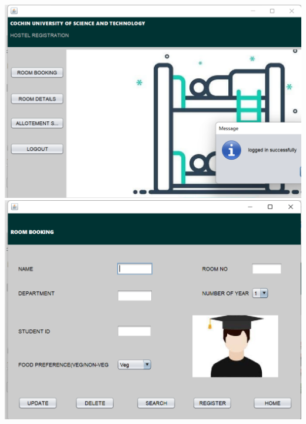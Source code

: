 \documentclass[a4paper,12pt]{report}
\begin{document}
\includegraphics[scale=0.3]{wardenhome.png}
\includegraphics[scale=0.3]{ROOMBOOKING.png}
\end{document}
